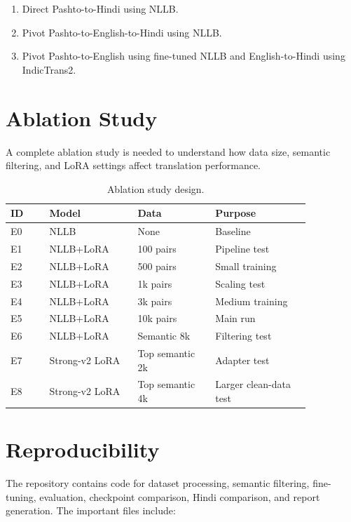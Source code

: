 \documentclass[conference]{IEEEtran}
\begin{document}
\begin{enumerate}
    \item Direct Pashto-to-Hindi using NLLB.
    \item Pivot Pashto-to-English-to-Hindi using NLLB.
    \item Pivot Pashto-to-English using fine-tuned NLLB and English-to-Hindi using IndicTrans2.
\end{enumerate}

\section{Ablation Study}

A complete ablation study is needed to understand how data size, semantic filtering, and LoRA settings affect translation performance.

\begin{table}[H]
\centering
\caption{Ablation study design.}
\footnotesize
\begin{tabular}{p{0.11\linewidth}p{0.25\linewidth}p{0.22\linewidth}p{0.27\linewidth}}
\toprule
\textbf{ID} & \textbf{Model} & \textbf{Data} & \textbf{Purpose} \\
\midrule
E0 & NLLB & None & Baseline \\
E1 & NLLB+LoRA & 100 pairs & Pipeline test \\
E2 & NLLB+LoRA & 500 pairs & Small training \\
E3 & NLLB+LoRA & 1k pairs & Scaling test \\
E4 & NLLB+LoRA & 3k pairs & Medium training \\
E5 & NLLB+LoRA & 10k pairs & Main run \\
E6 & NLLB+LoRA & Semantic 8k & Filtering test \\
E7 & Strong-v2 LoRA & Top semantic 2k & Adapter test \\
E8 & Strong-v2 LoRA & Top semantic 4k & Larger clean-data test \\
\bottomrule
\end{tabular}
\end{table}

\section{Reproducibility}

The repository contains code for dataset processing, semantic filtering, fine-tuning, evaluation, checkpoint comparison, Hindi comparison, and report generation. The important files include:
\end{document}
